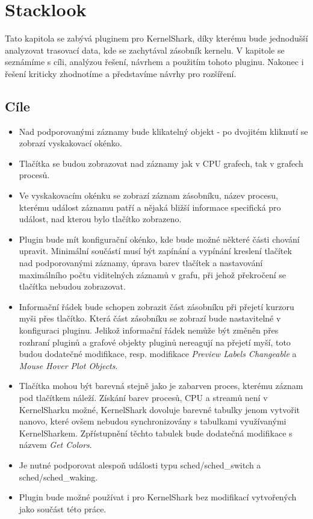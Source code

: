 \chapter{Stacklook}
\label{lookin-at-stacks}
Tato kapitola se zabývá pluginem pro KernelShark, díky kterému bude jednodušší analyzovat trasovací data, kde se zachytával zásobník kernelu. V kapitole se seznámíme s cíli, analýzou řešení, návrhem a použitím tohoto pluginu. Nakonec i řešení kriticky zhodnotíme a představíme návrhy pro rozšíření.

\section{Cíle}

\begin{itemize}
    \item Nad podporovanými záznamy bude klikatelný objekt - po dvojitém kliknutí se zobrazí vyskakovací okénko.
    \item Tlačítka se budou zobrazovat nad záznamy jak v CPU grafech, tak v grafech procesů.
    \item Ve vyskakovacím okénku se zobrazí záznam zásobníku, název procesu, kterému událost záznamu patří a nějaká bližší informace specifická pro událost, nad kterou bylo tlačítko zobrazeno.
    \item Plugin bude mít konfigurační okénko, kde bude možné některé části chování upravit. Minimální součástí musí být zapínání a vypínání kreslení tlačítek nad podporovanými záznamy, úprava barev tlačítek a nastavování maximálního počtu viditelných záznamů v grafu, při jehož překročení se tlačítka nebudou zobrazovat.
    \item Informační řádek bude schopen zobrazit část zásobníku při přejetí kurzoru myši přes tlačítko. Která část zásobníku se zobrazí bude nastavitelné v konfiguraci pluginu. Jelikož informační řádek nemůže být změněn přes rozhraní pluginů a grafové objekty pluginů nereagují na přejetí myší, toto budou dodatečné modifikace, resp. modifikace \emph{Preview Labels Changeable} a \emph{Mouse Hover Plot Objects}.
    \item Tlačítka mohou být barevná stejně jako je zabarven proces, kterému záznam pod tlačítkem náleží. Získání barev procesů, CPU a streamů není v KernelSharku možné, KernelShark dovoluje barevné tabulky jenom vytvořit nanovo, které ovšem nebudou synchronizovány s tabulkami využívanými KernelSharkem. Zpřístupnění těchto tabulek bude dodatečná modifikace s názvem \emph{Get Colors}.
    \item Je nutné podporovat alespoň události typu sched/sched\_switch a sched/sched\_waking.
    \item Plugin bude možné používat i pro KernelShark bez modifikací vytvořených jako součást této práce.
\end{itemize}

